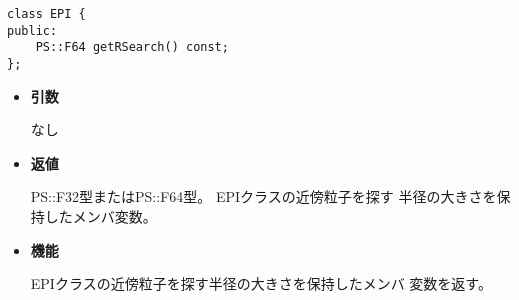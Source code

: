 \begin{screen}
\begin{verbatim}
class EPI {
public:
    PS::F64 getRSearch() const;
};
\end{verbatim}
\end{screen}

\begin{itemize}

\item {\bf 引数}

  なし
  
\item {\bf 返値}

  PS::F32型またはPS::F64型。 EPIクラスの近傍粒子を探す
  半径の大きさを保持したメンバ変数。
  
\item {\bf 機能}

  EPIクラスの近傍粒子を探す半径の大きさを保持したメンバ
  変数を返す。

\end{itemize}
